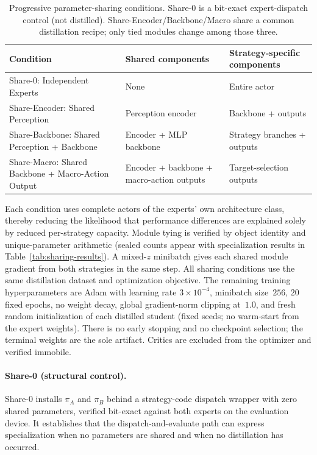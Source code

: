 \documentclass{article}
\begin{document}
\begin{table}[t]
\centering
\caption{Progressive parameter-sharing conditions. Share-0 is a bit-exact
expert-dispatch control (not distilled). Share-Encoder/Backbone/Macro share a
common distillation recipe; only tied modules change among those three.}
\label{tab:sharing}
\begin{tabular}{lll}
\toprule
\textbf{Condition} & \textbf{Shared components} & \textbf{Strategy-specific components} \\
\midrule
Share-0: Independent Experts
  & None
  & Entire actor \\
Share-Encoder: Shared Perception
  & Perception encoder
  & Backbone + outputs \\
Share-Backbone: Shared Perception + Backbone
  & Encoder + MLP backbone
  & Strategy branches + outputs \\
Share-Macro: Shared Backbone + Macro-Action Output
  & Encoder + backbone + macro-action outputs
  & Target-selection outputs \\
\bottomrule
\end{tabular}
\end{table}

Each condition uses complete actors of the experts' own architecture class,
thereby reducing the likelihood that performance differences are explained solely
by reduced per-strategy capacity. Module tying is verified by object identity
and unique-parameter arithmetic (sealed counts appear with specialization results
in Table~\ref{tab:sharing-results}). A mixed-$z$ minibatch gives each shared module
gradient from both strategies in the same step.
All sharing conditions use the same distillation dataset and optimization
objective.
The remaining training hyperparameters are Adam with learning rate $3{\times}10^{-4}$,
minibatch size~$256$, $20$ fixed epochs, no weight decay, global gradient-norm
clipping at~$1.0$, and fresh random initialization of each distilled student
(fixed seeds; no warm-start from the expert weights).
There is no early stopping and no checkpoint selection; the terminal weights
are the sole artifact.
Critics are excluded from the optimizer and verified immobile.

\paragraph{Share-0 (structural control).}
Share-0 installs $\pi_A$ and $\pi_B$ behind a strategy-code dispatch wrapper with
zero shared parameters, verified bit-exact against both experts on the
evaluation device. It establishes that the dispatch-and-evaluate path can
express specialization when no parameters are shared and when no distillation
has occurred.
\end{document}
